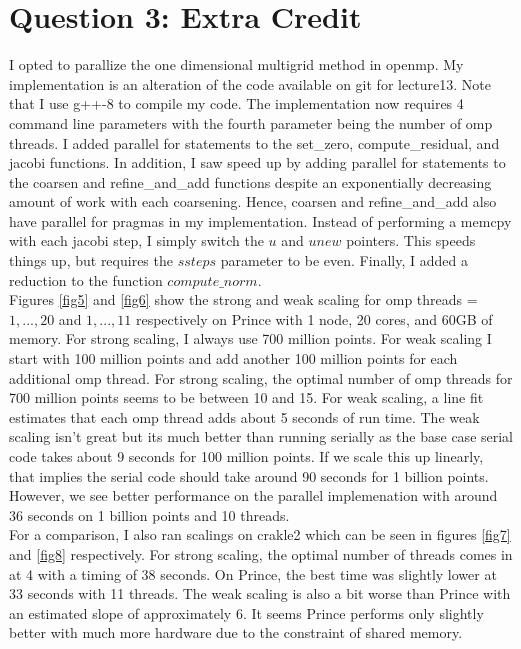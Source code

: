 \documentclass[10pt]{article}
\begin{document}
\lipsum


\section{Question 3: Extra Credit}

I opted to parallize the one dimensional multigrid method in openmp. My implementation is an alteration of the code available on git for lecture13. Note that I use g++-8 to compile my code. The implementation now requires 4 command line parameters with the fourth parameter being the number of omp threads. I added parallel for statements to the set\_zero, compute\_residual, and jacobi functions. In addition, I saw speed up by adding parallel for statements to the coarsen and refine\_and\_add functions despite an exponentially decreasing amount of work with each coarsening. Hence, coarsen and refine\_and\_add also have parallel for pragmas in my implementation. Instead of performing a memcpy with each jacobi step, I simply switch the $u$ and $unew$ pointers. This speeds things up, but requires the $ssteps$ parameter to be even. Finally, I added a reduction to the function $compute\_norm$.\\

Figures \ref{fig5} and \ref{fig6} show the strong and weak scaling for omp threads = $1,...,20$ and $1,...,11$ respectively on Prince with 1 node, 20 cores, and 60GB of memory. For strong scaling, I always use 700 million points. For weak scaling I start with 100 million points and add another 100 million points for each additional omp thread. For strong scaling, the optimal number of omp threads for 700 million points seems to be between 10 and 15. For weak scaling, a line fit estimates that each omp thread adds about 5 seconds of run time. The weak scaling isn't great but its much better than running serially as the base case serial code takes about 9 seconds for 100 million points. If we scale this up linearly, that implies the serial code should take around 90 seconds for 1 billion points. However, we see better performance on the parallel implemenation with around 36 seconds on 1 billion points and 10 threads.\\

For a comparison, I also ran scalings on crakle2 which can be seen in figures \ref{fig7} and \ref{fig8} respectively. For strong scaling, the optimal number of threads comes in at 4 with a timing of 38 seconds. On Prince, the best time was slightly lower at 33 seconds with 11 threads. The weak scaling is also a bit worse than Prince with an estimated slope of approximately 6. It seems Prince performs only slightly better with much more hardware due to the constraint of shared memory.
\end{document}
